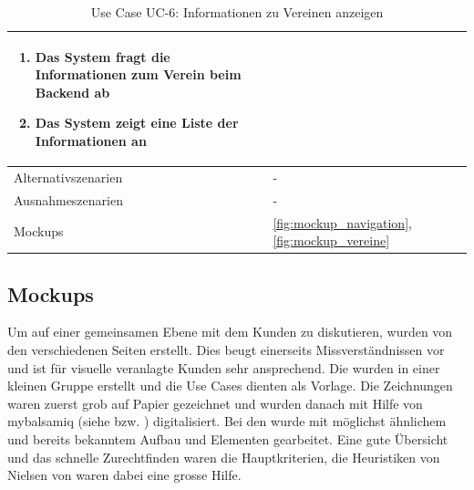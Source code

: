 \begin{table}[ht]
\begin{tabular}{ l | p{10cm} }
\begin{enumerate}
					\item Das System fragt die Informationen zum Verein beim Backend ab
					\item Das System zeigt eine Liste der Informationen an
					\end{enumerate}
					\\ \hline
	Alternativszenarien	&	-\\ \hline
	Ausnahmeszenarien&	-\\ \hline
	Mockups	 	&	\ref{fig:mockup_navigation}, \ref{fig:mockup_vereine}
  \end{tabular}
   \caption{Use Case UC-6: Informationen zu Vereinen anzeigen}\label{table:use_case_6}
\end{table}

\FloatBarrier
\subsection{Mockups}\label{mockups}
Um auf einer gemeinsamen Ebene mit dem Kunden zu diskutieren, wurden  von den verschiedenen Seiten erstellt. Dies beugt einerseits Missverständnissen vor und ist für visuelle veranlagte Kunden sehr ansprechend. Die  wurden in einer kleinen Gruppe erstellt und die Use Cases dienten als Vorlage. Die Zeichnungen waren zuerst grob auf Papier gezeichnet und wurden danach mit Hilfe von mybalsamiq (siehe \cite{zhaw_mybalsamiq} bzw. \cite{mybalsamiq}) digitalisiert. Bei den  wurde mit möglichst ähnlichem und bereits bekanntem Aufbau und Elementen gearbeitet. Eine gute Übersicht und das schnelle Zurechtfinden waren die Hauptkriterien, die Heuristiken von Nielsen von \cite{paper_usability} waren dabei eine grosse Hilfe.

